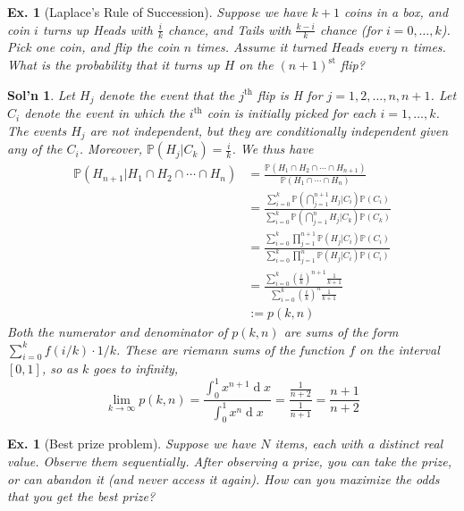 \documentclass[12pt, a4paper]{book}
\renewcommand{\Pr}{\mathbb{P}}
\renewcommand{\d}[1]{\ensuremath{\operatorname{d}\!{#1}}} %
\newtheorem{example}[theorem]{Ex.}
\theoremstyle{nonumberplain}
\newtheorem{solution}{Sol'n}
\begin{document}
\begin{example}[Laplace's Rule of Succession]
    Suppose we have $k+1$ coins in a box, and coin $i$ turns up Heads with $\frac{i}{k}$ chance, and Tails with $\frac{k-i}{k}$ chance (for $i=0,\ldots,k$).
    Pick one coin, and flip the coin $n$ times.
    Assume it turned Heads every $n$ times.
    What is the probability that it turns up $H$ on the $(n+1)^\text{st}$ flip?
\end{example}
\begin{solution}
    Let $H_j$ denote the event that the $j^\text{th}$ flip is H for $j=1,2,\ldots,n,n+1$.
    Let $C_i$ denote the event in which the $i^\text{th}$ coin is initially picked for each $i=1,\ldots,k$.
    The events $H_j$ are not independent, but they are conditionally independent given any of the $C_i$.
    Moreover, $\Pr(H_j|C_k)=\frac{i}{k}$.
    We thus have
    \begin{align*}
        \Pr(H_{n+1}|H_1\cap H_2\cap\cdots\cap H_n) &= \frac{\Pr(H_1\cap H_2\cap\cdots\cap H_{n+1})}{\Pr(H_1\cap\cdots\cap H_n)}\\
                                                   &= \frac{\sum\limits_{i=0}^k\Pr\left(\bigcap_{j=1}^{n+1}H_j|C_i\right)\Pr(C_i)}{\sum\limits_{i=0}^k\Pr\left(\bigcap\limits_{j=1}^nH_j|C_k\right)\Pr(C_k)}\\
                                                   &= \frac{\sum\limits_{i=0}^k\prod\limits_{j=1}^{n+1}\Pr(H_j|C_i)\Pr(C_i)}{\sum\limits_{i=0}^k\prod\limits_{j=1}^n\Pr(H_j|C_i)\Pr(C_i)}\\
                                                   &= \frac{\sum\limits_{i=0}^k\left(\frac{i}{k}\right)^{n+1}\frac{1}{k+1}}{\sum\limits_{i=0}^k\left(\frac{i}{k}\right)^n\frac{1}{k+1}}\\
                                                   &:= p(k,n)
    \end{align*}
    Both the numerator and denominator of $p(k,n)$ are sums of the form $\sum\limits_{i=0}^k f(i/k)\cdot 1/k$.
    These are riemann sums of the function $f$ on the interval $[0,1]$, so as $k$ goes to infinity,
    \[\lim_{k\to\infty}p(k,n)=\frac{\int_0^1 x^{n+1}\d{x}}{\int_0^1 x^n\d{x}}=\frac{\frac{1}{n+2}}{\frac{1}{n+1}}=\frac{n+1}{n+2}\]
\end{solution}
\begin{example}[Best prize problem]
    Suppose we have $N$ items, each with a distinct real value.
    Observe them sequentially.
    After observing a prize, you can take the prize, or can abandon it (and never access it again).
    How can you maximize the odds that you get the best prize?
\end{example}
\end{document}
